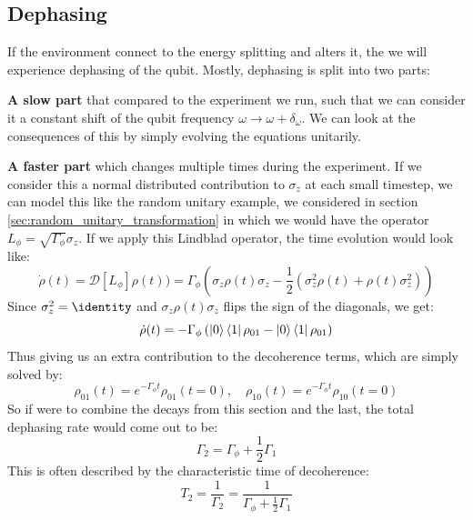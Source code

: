 \subsection{Dephasing}\label{sec:theory_t2}
If the environment connect to the energy splitting and alters it, the we will experience dephasing of the qubit. Mostly, dephasing is split into two parts: 

\textbf{A slow part} that compared to the experiment we run, such that we can consider it a constant shift of the qubit frequency $\omega \to \omega + \delta_\omega$. We can look at the consequences of this by simply evolving the equations unitarily. 


\textbf{A faster part} which changes multiple times during the experiment. If we consider this a normal distributed contribution to $\sigma_z$ at each small timestep, we can model this like the random unitary example, we considered in section \ref{sec:random_unitary_transformation} in which we would have the operator $L_\phi = \sqrt{\Gamma_\phi}\sigma_z$. If we apply this Lindblad operator, the time evolution would look like:
\begin{equation}
    \dot{\rho}(t) = \mathcal{D}[L_{\phi}]\rho(t)) = \Gamma_\phi\left(\sigma_z \rho(t) \sigma_z -\frac12( \sigma_z^2 \rho(t) + \rho(t) \sigma_z^2)\right)
\end{equation}
Since $\sigma_z^2 = \identity$ and $\sigma_z \rho(t) \sigma_z$ flips the sign of the diagonals, we get:
\begin{equation}
    \dot{\rho}(t) = - \Gamma_\phi \left(\ket{0}\bra{1}\rho_{01} - \ket{0}\bra{1}\rho_{01}\right)
\end{equation}
Thus giving us an extra contribution to the decoherence terms, which are simply solved by:
\begin{equation}
    \rho_{01}(t) = e^{-\Gamma_\phi t}\rho_{01}(t=0), \quad \rho_{10}(t) = e^{-\Gamma_\phi t}\rho_{10}(t=0)
\end{equation}
So if were to combine the decays from this section and the last, the total dephasing rate would come out to be:
\begin{equation}
    \Gamma_2 = \Gamma_\phi + \frac12\Gamma_1 
\end{equation}
This is often described by the characteristic time of decoherence:
\begin{equation}\label{eq:t2_equation}
    T_2 = \frac{1}{\Gamma_2} = \frac{1}{\Gamma_\phi + \frac12\Gamma_1 } 
\end{equation}



